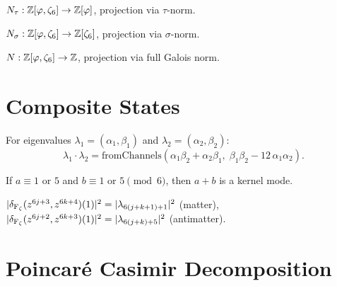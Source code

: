 \begin{definition}
\label{def:tau-coarsen}
$N_\tau: \mathbb{Z}[\varphi,\zeta_6] \to \mathbb{Z}[\varphi]$, projection via $\tau$-norm.
\end{definition}

\begin{definition}
\label{def:sigma-coarsen}
$N_\sigma: \mathbb{Z}[\varphi,\zeta_6] \to \mathbb{Z}[\zeta_6]$, projection via $\sigma$-norm.
\end{definition}

\begin{definition}
\label{def:full-norm}
$N: \mathbb{Z}[\varphi,\zeta_6] \to \mathbb{Z}$, projection via full Galois norm.
\end{definition}

\section{Composite States}

\begin{theorem}
\label{thm:composite-channels}
For eigenvalues $\lambda_1 = (\alpha_1, \beta_1)$ and $\lambda_2 = (\alpha_2, \beta_2)$:
\[
  \lambda_1 \cdot \lambda_2 =
  \mathrm{fromChannels}(\alpha_1\beta_2 + \alpha_2\beta_1,\;
  \beta_1\beta_2 - 12\,\alpha_1\alpha_2).
\]
\end{theorem}

\begin{theorem}[Active $\times$ active $=$ kernel]
\label{thm:active-product-kernel}
If $a \equiv 1$ or $5$ and $b \equiv 1$ or $5 \pmod{6}$,
then $a + b$ is a kernel mode.
\end{theorem}

\begin{theorem}
\label{thm:emergence-tau-norm}
$|\delta_{\operatorname{F_\zeta}}(z^{6j+3}, z^{6k+4})(1)|^2 = |\lambda_{6(j+k+1)+1}|^2$ (matter),
$|\delta_{\operatorname{F_\zeta}}(z^{6j+2}, z^{6k+3})(1)|^2 = |\lambda_{6(j+k)+5}|^2$ (antimatter).
\end{theorem}

\section{Poincar\'{e} Casimir Decomposition}

